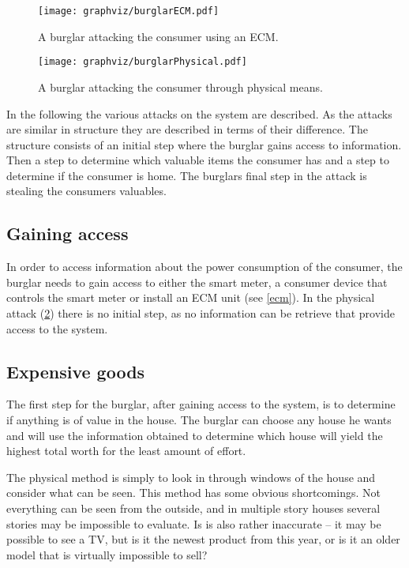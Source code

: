 \begin{figure}
\center
\texttt{[image: graphviz/burglarECM.pdf]}
\caption{A burglar attacking the consumer using an ECM.}
\label{attacktree:burglar:ecm}
\end{figure}

\begin{figure}
\center
\texttt{[image: graphviz/burglarPhysical.pdf]}
\caption{A burglar attacking the consumer through physical means.}
\label{attacktree:burglar:physical}
\end{figure}

In the following the various attacks on the system are described.
As the attacks are similar in structure they are described in terms of their difference.
The structure consists of an initial step where the burglar gains access to information.
Then a step to determine which valuable items the consumer has and a step to determine if the consumer is home.
The burglars final step in the attack is stealing the consumers valuables.

\subsection{Gaining access}
In order to access information about the power consumption of the consumer, the burglar needs to gain access to either the smart meter, a consumer device that controls the smart meter or install an ECM unit (see \cref{ecm}).
In the physical attack (\cref{attacktree:burglar:physical}) there is no initial step, as no information can be retrieve that provide access to the system.

\subsection{Expensive goods}
The first step for the burglar, after gaining access to the system, is to determine if anything is of value in the house. 
The burglar can choose any house he wants and will use the information obtained to determine which house will yield the highest total worth for the least amount of effort.

The physical method is simply to look in through windows of the house and consider what can be seen. 
This method has some obvious shortcomings.
Not everything can be seen from the outside, and in multiple story houses several stories may be impossible to evaluate.
Is is also rather inaccurate -- it may be possible to see a TV, but is it the newest product from this year, or is it an older model that is virtually impossible to sell?

